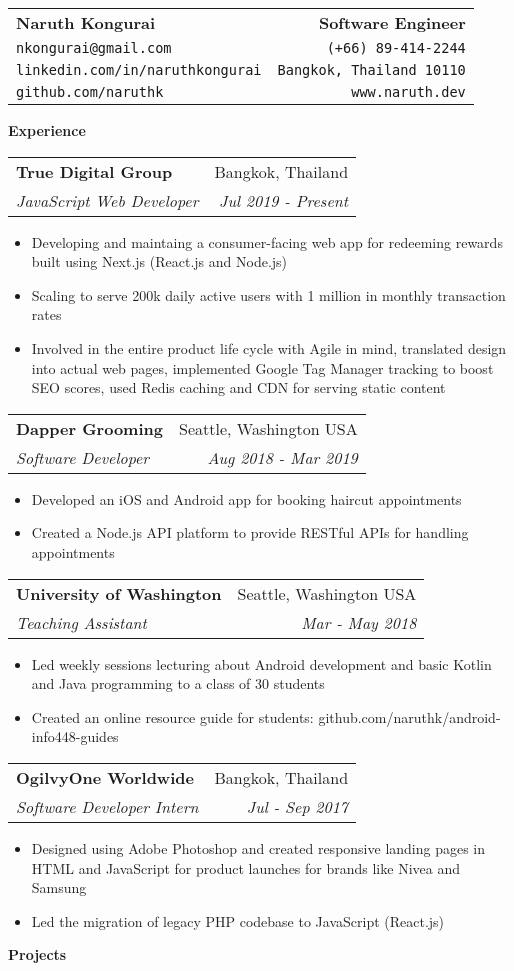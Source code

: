 \documentclass[10pt,a4paper]{article}
\makeatletter
\newcommand{\bio}[8]{
  \begin{tabular*}{7.0in}{l@{\extracolsep{\fill}}r}
    \textbf{\LARGE #1} & \textbf{\large #2} \\
    \texttt{#3} & \texttt{#4} \\
    \texttt{#5} & \texttt{#6} \\
    \texttt{#7} & \texttt{#8}
  \end{tabular*}
}
\newcommand{\sectionheading}[1]{
  \vspace{12pt}
  \textbf{\Large #1}
  \vspace{6pt}
}
\newcommand{\subheadinginfo}[4]{
  \vspace{6pt}
  
  \begin{tabular*}{6.8in}{l@{\extracolsep{\fill}}r}
    \textbf{#1} & #2 \\
    \textit{#3} & \textit{#4} \\
  \end{tabular*}
  
  \vspace{-4pt}
}
\newcommand{\listitem}[1]{
  \item #1 \vspace{-5pt}
}
\makeatother
\begin{document}
\bio
{Naruth Kongurai}
{Software Engineer}
{nkongurai@gmail.com}
{(+66) 89-414-2244}
{linkedin.com/in/naruthkongurai}
{Bangkok, Thailand 10110}
{github.com/naruthk}
{www.naruth.dev}

\sectionheading{Experience}

\subheadinginfo
{True Digital Group}
{Bangkok, Thailand}
{JavaScript Web Developer}
{Jul 2019 - Present}

\begin{itemize}
  \listitem{Developing and maintaing a consumer-facing web app for redeeming 
  rewards built using Next.js (React.js and Node.js)}
  \listitem{Scaling to serve 200k daily active users with 1 million 
  in monthly transaction rates}
  \listitem{Involved in the entire product life cycle with Agile in mind, 
  translated design into actual web pages, implemented Google Tag Manager 
  tracking to boost SEO scores, used Redis caching and CDN for serving static content}
\end{itemize}

\subheadinginfo
{Dapper Grooming}
{Seattle, Washington USA}
{Software Developer}
{Aug 2018 - Mar 2019}

\begin{itemize}
  \listitem{Developed an iOS and Android app for booking haircut appointments}
  \listitem{Created a Node.js API platform to provide RESTful APIs for handling appointments}
\end{itemize}

\subheadinginfo
{University of Washington}
{Seattle, Washington USA}
{Teaching Assistant}
{Mar - May 2018}

\begin{itemize}
  \listitem{Led weekly sessions lecturing about Android development and basic
  Kotlin and Java programming to a class of 30 students}
  \listitem{Created an online resource guide for students: github.com/naruthk/android-info448-guides}
\end{itemize}

\subheadinginfo
{OgilvyOne Worldwide}
{Bangkok, Thailand}
{Software Developer Intern}
{Jul - Sep 2017}

\begin{itemize}
  \listitem{Designed using Adobe Photoshop and created responsive landing pages
  in HTML and JavaScript for product launches for brands like Nivea and Samsung}
  \listitem{Led the migration of legacy PHP codebase to JavaScript (React.js)}
\end{itemize}

\sectionheading{Projects}
\end{document}
